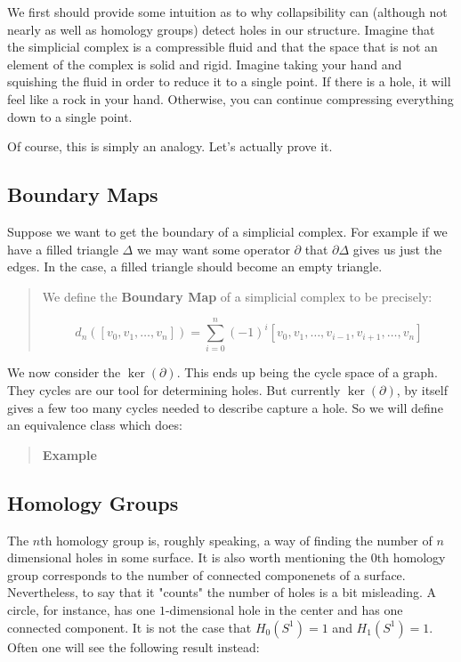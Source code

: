 \documentclass[letterpaper,12pt]{article}
\begin{document}
We first should provide some intuition as to why collapsibility can (although not nearly as well as homology groups) detect holes in our structure. Imagine that the simplicial complex is a compressible fluid and that the space that is not an element of the complex is solid and rigid. Imagine taking your hand and squishing the fluid in order to reduce it to a single point. If there is a hole, it will feel like a rock in your hand. Otherwise, you can continue compressing everything down to a single point.

Of course, this is simply an analogy. Let's actually prove it.

\subsection{Boundary Maps}

Suppose we want to get the boundary of a simplicial complex. For example if we have a filled triangle $\Delta$ we may want some operator $\partial$ that $\partial \Delta$ gives us just the edges. In the case, a filled triangle should become an empty triangle.

\begin{quote}
    We define the \textbf{Boundary Map} of a simplicial complex to be precisely:
    
    $$d_n([v_0,v_1,\ldots,v_n]) = \sum_{i=0}^n (-1)^i[v_0,v_1,\ldots,v_{i-1},v_{i+1},\ldots,v_n ]$$
\end{quote}

We now consider the $\ker(\partial)$. This ends up being the cycle space of a graph. They cycles are our tool for determining holes. But currently $\ker(\partial)$, by itself gives a few too many cycles needed to describe capture a hole. So we will define an equivalence class which does:

\begin{quote}
    \textbf{Example}
\end{quote}

\begin{quote}
\end{quote}

\subsection{Homology Groups}

The $n$th homology group is, roughly speaking, a way of finding the number of $n$ dimensional holes in some surface. It is also worth mentioning the $0$th homology group corresponds to the number of connected componenets of a surface. Nevertheless, to say that it "counts" the number of holes is a bit misleading. A circle, for instance, has one $1$-dimensional hole in the center and has one connected component. It is not the case that $H_0(S^1) = 1$ and $H_1(S^1) = 1$. Often one will see the following result instead:
\end{document}
